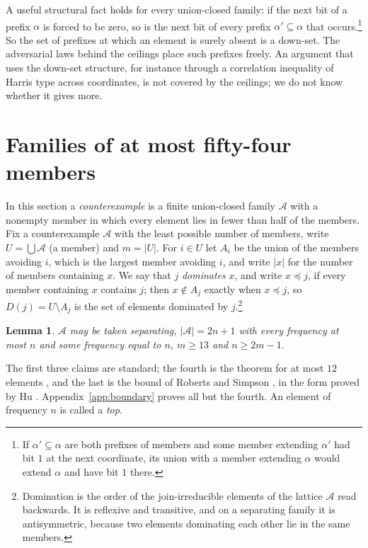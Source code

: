 \documentclass[aps,prd,twocolumn,superscriptaddress,nofootinbib,longbibliography,floatfix,amsmath,amssymb,10pt]{revtex4-2}
\theoremstyle{plain}
\newtheorem{lemma}[theorem]{Lemma}
\theoremstyle{definition}
\theoremstyle{plain}
\newcommand{\cA}{\mathcal{A}}
\begin{document}
A useful structural fact holds for every union-closed family: if the next bit of a prefix $\alpha$ is forced to be zero, so is the next bit of every prefix $\alpha'\subseteq\alpha$ that occurs.\footnote{If $\alpha'\subseteq\alpha$ are both prefixes of members and some member extending $\alpha'$ had bit $1$ at the next coordinate, its union with a member extending $\alpha$ would extend $\alpha$ and have bit $1$ there.} So the set of prefixes at which an element is surely absent is a down-set. The adversarial laws behind the ceilings place such prefixes freely. An argument that uses the down-set structure, for instance through a correlation inequality of Harris type across coordinates, is not covered by the ceilings; we do not know whether it gives more.

\section{Families of at most fifty-four members}\label{sec:small}

In this section a \emph{counterexample} is a finite union-closed family $\cA$ with a nonempty member in which every element lies in fewer than half of the members. Fix a counterexample $\cA$ with the least possible number of members, write $U=\bigcup\cA$ (a member) and $m=|U|$. For $i\in U$ let $A_i$ be the union of the members avoiding $i$, which is the largest member avoiding $i$, and write $|x|$ for the number of members containing $x$. We say that $j$ \emph{dominates} $x$, and write $x\preceq j$, if every member containing $x$ contains $j$; then $x\notin A_j$ exactly when $x\preceq j$, so $D(j)=U\setminus A_j$ is the set of elements dominated by $j$.\footnote{Domination is the order of the join-irreducible elements of the lattice $\cA$ read backwards. It is reflexive and transitive, and on a separating family it is antisymmetric, because two elements dominating each other lie in the same members.}

\begin{lemma}\label{lem:smallest}
$\cA$ may be taken separating, $|\cA|=2n+1$ with every frequency at most $n$ and some frequency equal to $n$, $m\ge 13$ and $n\ge 2m-1$.
\end{lemma}

The first three claims are standard; the fourth is the theorem for at most $12$ elements \cite{VZ17}, and the last is the bound of Roberts and Simpson \cite{RS10}, in the form proved by Hu \cite{Hu17}. Appendix~\ref{app:boundary} proves all but the fourth. An element of frequency $n$ is called a \emph{top}.
\end{document}
